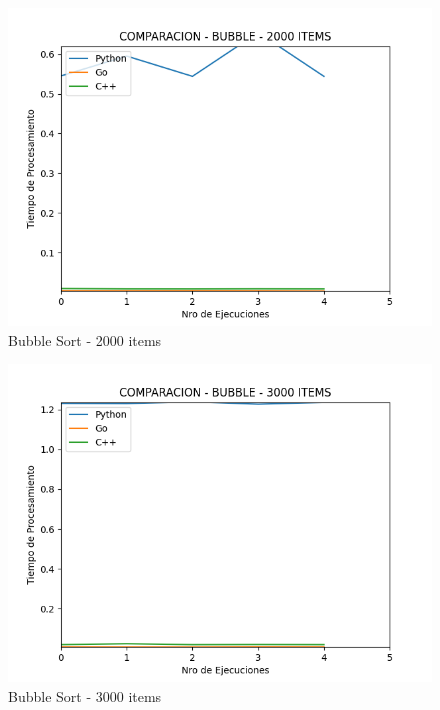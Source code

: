 \documentclass[12pt]{article} %
\begin{document}
    \begin{figure}[H]
    \centering
    \includegraphics[width=\textwidth]{bubble_2000}
    \caption{Bubble Sort - 2000 items}
    \end{figure}
    
    \vspace{5mm}
    
    \begin{figure}[H]
    \centering
    \includegraphics[width=\textwidth]{bubble_3000}
    \caption{Bubble Sort - 3000 items}
    \end{figure}
    
    \vspace{5mm}
    
\end{document}
